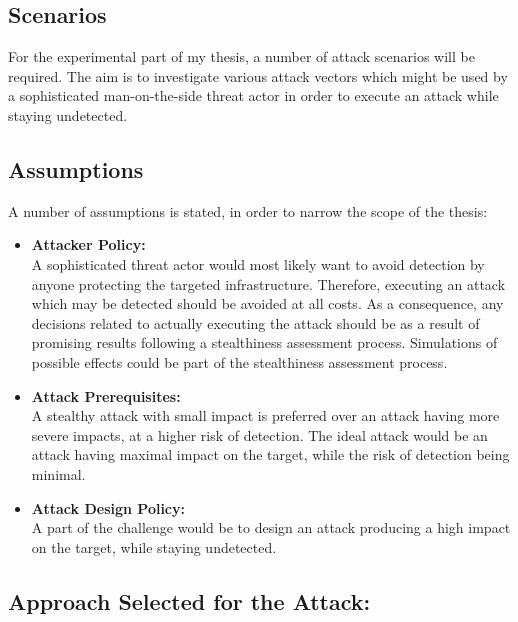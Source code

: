 \subsection{Scenarios}

For the experimental part of my thesis, a number of attack scenarios will be required. The aim is to investigate various attack vectors which might be used by a sophisticated man-on-the-side threat actor in order to execute an attack while staying undetected. 

\subsection{Assumptions} 

A number of assumptions is stated, in order to narrow the scope of the thesis:

\begin{itemize}
    
\item \textbf{Attacker Policy:}\\   A sophisticated threat actor would most likely want to avoid detection by anyone protecting the targeted infrastructure.
Therefore, executing an attack which may be detected should be avoided at all costs.
As a consequence, any decisions related to actually executing the attack should be as a result of promising results following a stealthiness assessment process. Simulations of possible effects could be part of the stealthiness assessment process. 

\item \textbf{Attack Prerequisites:}\\   A stealthy attack with small impact is preferred over an attack having more severe impacts, at a higher risk of detection.
The ideal attack would be an attack having maximal impact on the target, while the risk of detection being minimal. 


\item \textbf{Attack Design Policy:}\\   A part of the challenge would be to design an attack producing a high impact on the target, while staying undetected.
\end{itemize}
\subsection{Approach Selected for the Attack:}


